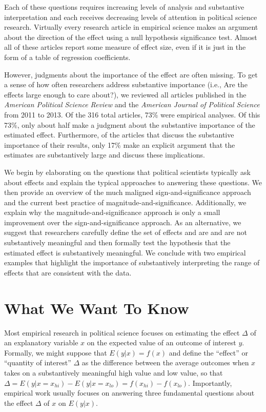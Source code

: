 \documentclass[12pt]{article}
\begin{document}
\noindent Each of these questions requires increasing levels of analysis and substantive interpretation and each receives decreasing levels of attention in political science research. Virtually every research article in empirical science makes an argument about the direction of the effect using a null hypothesis significance test. Almost all of these articles report some measure of effect size, even if it is just in the form of a table of regression coefficients. 

However, judgments about the importance of the effect are often missing. To get a sense of how often researchers address substantive importance (i.e., Are the effects large enough to care about?), we reviewed all articles published in the \textit{American Political Science Review} and the \textit{American Journal of Political Science} from 2011 to 2013. Of the 316 total articles, 73\% were empirical analyses. Of this 73\%, only about half make a judgment about the substantive importance of the estimated effect. Furthermore, of the articles that discuss the substantive importance of their results, only 17\% make an explicit argument that the estimates are substantively large and discuss these implications.

We begin by elaborating on the questions that political scientists typically ask about effects and explain the typical approaches to answering these questions. We then provide an overview of the much maligned sign-and-significance approach and the current best practice of magnitude-and-significance. Additionally, we explain why the magnitude-and-significance approach is only a small improvement over the sign-and-significance approach. As an alternative, we suggest that researchers carefully define the set of effects and are and are not substantively meaningful and then formally test the hypothesis that the estimated effect is substantively meaningful. We conclude with two empirical examples that highlight the importance of substantively interpreting the range of effects that are consistent with the data.

\section*{What We Want To Know}

Most empirical research in political science focuses on estimating the effect $\Delta$ of an explanatory variable $x$ on the expected value of an outcome of interest $y$. Formally, we might suppose that $E(y | x) = f(x)$ and define the ``effect'' or ``quantity of interest'' $\Delta$ as the difference between the average outcomes when $x$ takes on a substantively meaningful high value and low value, so that $\Delta = E(y | x = x_{hi}) - E(y | x = x_{lo}) = f(x_{hi}) - f(x_{lo})$. Importantly, empirical work usually focuses on answering three fundamental questions about the effect $\Delta$ of $x$ on $E(y|x)$. 
\end{document}

